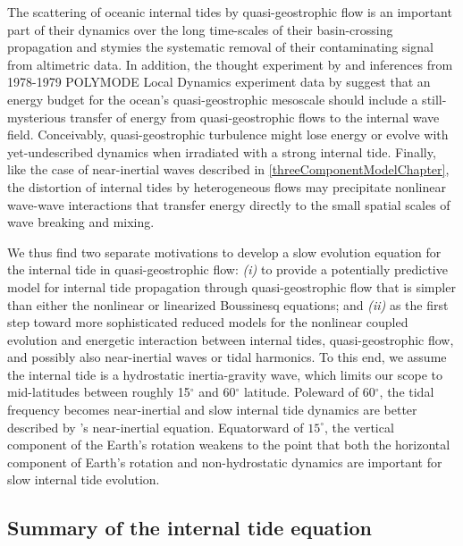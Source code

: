 \documentclass[12pt, oneside]{book}
\begin{document}
The scattering of oceanic internal tides by quasi-geostrophic flow is an important part of their dynamics over the long time-scales of their basin-crossing propagation and stymies the systematic removal of their contaminating signal from altimetric data.  In addition, the thought experiment by \citet{buhler2005wavecapture} and inferences from 1978-1979 POLYMODE Local Dynamics experiment data by \cite{polzin2010mesoscale} suggest that an energy budget for the ocean's quasi-geostrophic mesoscale should include a still-mysterious transfer of energy from quasi-geostrophic flows to the internal wave field.  Conceivably, quasi-geostrophic turbulence might lose energy or evolve with yet-undescribed dynamics when irradiated with a strong internal tide.  Finally, like the case of near-inertial waves described in \ch \ref{threeComponentModelChapter}, the distortion of internal tides by heterogeneous flows may precipitate nonlinear wave-wave interactions that transfer energy directly to the small spatial scales of wave breaking and mixing.  



We thus find two separate motivations to develop a slow evolution equation for the internal tide in quasi-geostrophic flow: \textit{(i)} to provide a potentially predictive model for internal tide propagation through quasi-geostrophic flow that is simpler than either the nonlinear or linearized Boussinesq equations; and \textit{(ii)} as the first step toward more sophisticated reduced models for the nonlinear coupled evolution and energetic interaction between internal tides, quasi-geostrophic flow, and possibly also near-inertial waves or tidal harmonics.  To this end, we assume the internal tide is a hydrostatic inertia-gravity wave, which limits our scope to mid-latitudes between roughly 15$^\circ$ and 60$^\circ$ latitude.  Poleward of 60$^\circ$, the tidal frequency becomes near-inertial and slow internal tide dynamics are better described by \cite{YBJ}'s near-inertial equation.  Equatorward of $15^\circ$, the vertical component of the Earth's rotation weakens to the point that both the horizontal component of Earth's rotation and non-hydrostatic dynamics are important for slow internal tide evolution.  

\subsection{Summary of the internal tide equation}
\end{document}
